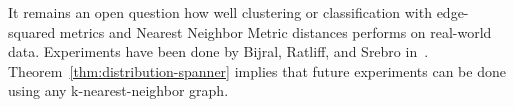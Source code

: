 It remains an open question how well clustering or
classification with
edge-squared metrics and Nearest Neighbor Metric distances performs on real-world
data.
Experiments have been done by Bijral, Ratliff, and
Srebro in~\cite{bijral11semiSupLearningDBD}.
Theorem~\ref{thm:distribution-spanner} implies that future experiments
can be done using any
k-nearest-neighbor graph.


